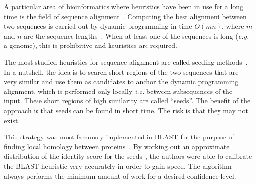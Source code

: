 \documentclass{article}
\begin{document}
A particular area of bioinformatics where heuristics have been in use for
a long time is the field of sequence alignment~\cite{pmid20460430}.
Computing the best alignment between two sequences is carried out by
dynamic programming in time $O(mn)$, where $m$ and $n$ are the sequence
lengths~\cite{durbin1998biological}. When at least one of the sequences is
long (\textit{e.g.} a genome), this is prohibitive and heuristics are
required.

The most studied heuristics for sequence alignment are called seeding
methods~\cite{pmid16533404}. In a nutshell, the idea is to search short
regions of the two sequences that are very similar and use them as
candidates to anchor the dynamic programming alignment, which is performed
only locally \textit{i.e.} between subsequences of the input. These short
regions of high similarity are called ``seeds''. The benefit of the
approach is that seeds can be found in short time. The risk is that they
may not exist.

This strategy was most famously implemented in BLAST for the purpose of
finding local homology between proteins~\cite{pmid2231712}. By working out
an approximate distribution of the identity score for the
seeds~\cite{pmid8390686, pmid2315319}, the authors were able to calibrate
the BLAST heuristic very accurately in order to gain speed. The algorithm
always performs the minimum amount of work for a desired confidence level.
\end{document}
